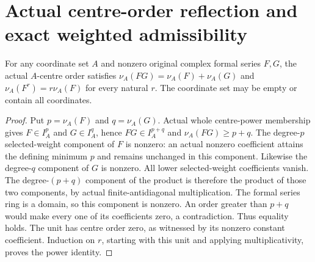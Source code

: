 \section{Actual centre-order reflection and exact weighted admissibility}
\label{sec:hironaka-actual-weighted-coordinate-power-reflection}

\begin{theorem}
\label{hir:actual-selected-coordinate-order-multiplicative}
\leanok
For any coordinate set $A$ and nonzero original complex formal series $F,G$,
the actual $A$-centre order satisfies
$\nu_A(FG)=\nu_A(F)+\nu_A(G)$ and $\nu_A(F^r)=r\nu_A(F)$ for every natural $r$.
The coordinate set may be empty or contain all coordinates.
\end{theorem}
\begin{proof}
Put $p=\nu_A(F)$ and $q=\nu_A(G)$. Actual whole centre-power membership gives
$F\in I_A^p$ and $G\in I_A^q$, hence $FG\in I_A^{p+q}$ and
$\nu_A(FG)\ge p+q$. The degree-$p$ selected-weight component of $F$ is nonzero:
an actual nonzero coefficient attains the defining minimum $p$ and remains
unchanged in this component. Likewise the degree-$q$ component of $G$ is nonzero.
All lower selected-weight coefficients vanish. The degree-$(p+q)$ component of
the product is therefore the product of those two components, by actual
finite-antidiagonal multiplication. The formal series ring is a domain, so
this component is nonzero. An order greater than $p+q$ would make every one of
its coefficients zero, a contradiction. Thus equality holds. The unit has
centre order zero, as witnessed by its nonzero constant coefficient. Induction
on $r$, starting with this unit and applying multiplicativity, proves the power
identity.
\end{proof}


